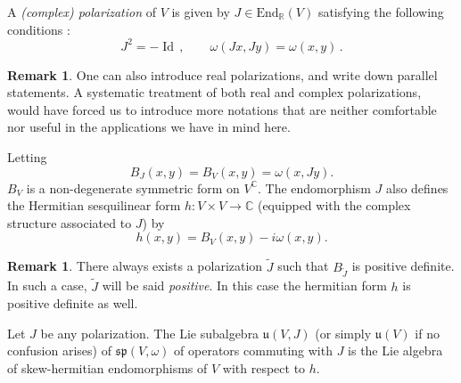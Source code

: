 \documentclass{amsart}[draft,11pt]
\numberwithin{equation}{section}
\theoremstyle{definition}
\newtheorem{remark}[theorem]{Remark}
\begin{document}
A \emph{(complex) polarization} of $V$
is given by $J\in \mathrm{End}_\mathbb{R}(V)$ 
satisfying the following conditions :
$$
    J^2=-\mathop{Id}\,,\qquad
    \omega(Jx,Jy)= \omega(x,y)\,.
$$
\begin{remark}
One can also introduce real polarizations, and write down parallel statements. A systematic treatment
of both real and complex polarizations, would have forced us to introduce more notations that are neither
comfortable nor useful in the applications we have in mind here.
\end{remark}
Letting
$$ B_J(x,y)=B_V(x,y) = \omega(x,Jy) .$$
$B_V$ is a non-degenerate symmetric form on $V^\mathbb{C}$. The endomorphism $J$ also defines  the Hermitian sesquilinear form $h\colon V\times V \to \mathbb{C}$ (equipped with the complex structure associated to $J$)  by
\begin{equation}
h(x,y) = B_V(x,y) -i\omega (x,y).
\label{def_h}
\end{equation}
\begin{remark}
There always exists a polarization $\tilde{J}$ such that $B_{\tilde{J}}$ is positive definite. In such a case, $\tilde{J}$ will be said \emph{positive}. In this case the hermitian form $h$ is positive definite as well.
\end{remark}

Let $J$ be any polarization. The Lie subalgebra $\mathfrak{u}(V,J)$
(or simply $\mathfrak{u}(V)$ if no confusion arises) of 
$\mathfrak{sp}(V,\omega)$ of operators commuting with
$J$ is the Lie algebra of skew-hermitian endomorphisms of $V$ with respect to $h$.
\end{document}

